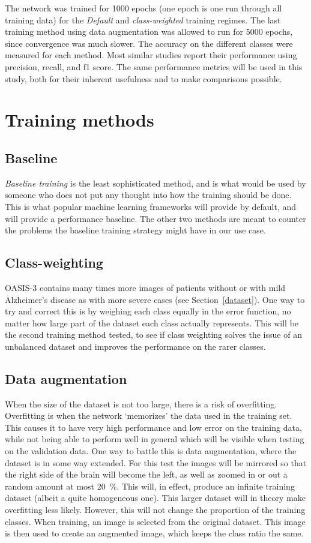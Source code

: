 \documentclass{kththesis}
\begin{document}
The network was trained for \num{1000} epochs (one epoch is one run through all training data) for the \textit{Default} and \textit{class-weighted} training regimes. The last training method using data augmentation was allowed to run for \num{5000} epochs, since convergence was much slower. The accuracy on the different classes were measured for each method. Most similar studies report their performance using precision, recall, and f1 score. The same performance metrics will be used in this study, both for their inherent usefulness and to make comparisons possible.

\section{Training methods}
\subsection{Baseline}
\textit{Baseline training} is the least sophisticated method, and is what would be used by someone who does not put any thought into how the training should be done. This is what popular machine learning frameworks will provide by default, and will provide a performance baseline. The other two methods are meant to counter the problems the baseline training strategy might have in our use case.

\subsection{Class-weighting}
OASIS-3 contains many times more images of patients without or with mild Alzheimer's disease as with more severe cases (see Section~\ref{dataset}). One way to try and correct this is by weighing each class equally in the error function, no matter how large part of the dataset each class actually represents. This will be the second training method tested, to see if class weighting solves the issue of an unbalanced dataset and improves the performance on the rarer classes.

\subsection{Data augmentation}
When the size of the dataset is not too large, there is a risk of overfitting. Overfitting is when the network `memorizes' the data used in the training set. This causes it to have very high performance and low error on the training data, while not being able to perform well in general which will be visible when testing on the validation data. One way to battle this is data augmentation, where the dataset is in some way extended. For this test the images will be mirrored so that the right side of the brain will become the left, as well as zoomed in or out a random amount at most 20~\%. This will, in effect, produce an infinite training dataset (albeit a quite homogeneous one). This larger dataset will in theory make overfitting less likely. However, this will not change the proportion of the training classes. When training, an image is selected from the original dataset. This image is then used to create an augmented image, which keeps the class ratio the same.
\end{document}
